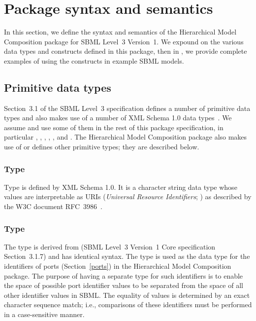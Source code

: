 
\section{Package syntax and semantics}
\label{sec:syntax}

In this section, we define the syntax and semantics of the Hierarchical
Model Composition package for SBML Level~3 Version~1.  We expound on the
various data types and constructs defined in this package, then in
, we provide complete examples of using the constructs in
example SBML models.


\subsection{Primitive data types}
\label{new-primitive-types}

Section~3.1 of the SBML Level~3 specification defines a number of
primitive data types and also makes use of a number of XML Schema 1.0
data types~\cite{}.  We assume and use some of them in the rest of this
package specification, in particular , ,
, , , and
.  The Hierarchical Model Composition package also
makes use of or defines other primitive types; they are described below.


\subsubsection{Type \hspace*{1pt}}
\label{primtype-anyuri}
\label{primtype-uri}

Type  is defined by XML Schema 1.0.  It is a character
string data type whose values are interpretable as URIs (\emph{Universal
  Resource Identifiers}; \citealt{harold:2001,w3c:2000}) as described by
the W3C document RFC~3986~\cite{rfc3986}.


\subsubsection{Type \hspace*{1pt}}
\label{primtype-portid}

The type  is derived from  (SBML Level~3
Version~1 Core specification Section~3.1.7) and has identical syntax.
The  type is used as the data type for the identifiers
of ports (Section~\ref{ports}) in the Hierarchical Model Composition
package.  The purpose of having a separate type for such identifiers is
to enable the space of possible port identifier values to be separated
from the space of all other identifier values in SBML.  The equality of
 values is determined by an exact character sequence
match; i.e., comparisons of these identifiers must be performed in a
case-sensitive manner.



